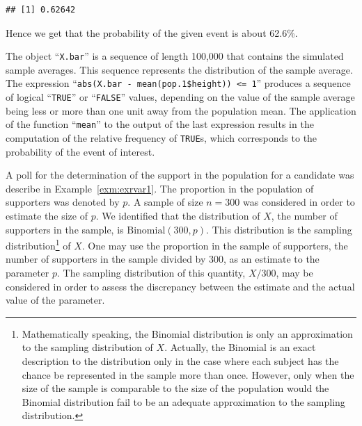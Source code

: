 \documentclass[]{krantz}
\makeatletter
\newenvironment{Shaded}{\begin{snugshade}}{\end{snugshade}}
\newcommand{\KeywordTok}[1]{\textcolor[rgb]{0.13,0.29,0.53}{\textbf{#1}}}
\newcommand{\DecValTok}[1]{\textcolor[rgb]{0.00,0.00,0.81}{#1}}
\newcommand{\StringTok}[1]{\textcolor[rgb]{0.31,0.60,0.02}{#1}}
\newcommand{\OperatorTok}[1]{\textcolor[rgb]{0.81,0.36,0.00}{\textbf{#1}}}
\newcommand{\NormalTok}[1]{#1}
\newenvironment{kframe}{%
\medskip{}
\setlength{\fboxsep}{.8em}
 \def\at@end@of@kframe{}%
 \ifinner\ifhmode%
  \def\at@end@of@kframe{\end{minipage}}%
  \begin{minipage}{\columnwidth}%
 \fi\fi%
 \def\FrameCommand##1{\hskip\@totalleftmargin \hskip-\fboxsep
 \colorbox{shadecolor}{##1}\hskip-\fboxsep
     \hskip-\linewidth \hskip-\@totalleftmargin \hskip\columnwidth}%
 \MakeFramed {\advance\hsize-\width
   \@totalleftmargin\z@ \linewidth\hsize
   \@setminipage}}%
 {\par\unskip\endMakeFramed%
 \at@end@of@kframe}
\renewenvironment{Shaded}{\begin{kframe}}{\end{kframe}}
\theoremstyle{definition}
\theoremstyle{definition}
\theoremstyle{definition}
\theoremstyle{remark}
\let\BeginKnitrBlock\begin \let\EndKnitrBlock\end
\makeatother
\begin{document}
\begin{Shaded}
\end{Shaded}

\begin{verbatim}
## [1] 0.62642
\end{verbatim}

Hence we get that the probability of the given event is about 62.6\%.

The object ``\texttt{X.bar}'' is a sequence of length 100,000 that
contains the simulated sample averages. This sequence represents the
distribution of the sample average. The expression
``\texttt{abs(X.bar\ -\ mean(pop.1\$height))\ \textless{}=\ 1}''
produces a sequence of logical ``\texttt{TRUE}'' or ``\texttt{FALSE}''
values, depending on the value of the sample average being less or more
than one unit away from the population mean. The application of the
function ``\texttt{mean}'' to the output of the last expression results
in the computation of the relative frequency of \texttt{TRUE}s, which
corresponds to the probability of the event of interest.

\BeginKnitrBlock{example}
\protect\hypertarget{exm:exsampdist1}{}{\label{exm:exsampdist1} }A poll for
the determination of the support in the population for a candidate was
describe in Example~\ref{exm:exrvar1}. The proportion in the population
of supporters was denoted by \(p\). A sample of size \(n=300\) was
considered in order to estimate the size of \(p\). We identified that
the distribution of \(X\), the number of supporters in the sample, is
\(\mathrm{Binomial}(300,p)\). This distribution is the sampling
distribution\footnote{Mathematically speaking, the Binomial distribution
  is only an approximation to the sampling distribution of \(X\).
  Actually, the Binomial is an exact description to the distribution
  only in the case where each subject has the chance be represented in
  the sample more than once. However, only when the size of the sample
  is comparable to the size of the population would the Binomial
  distribution fail to be an adequate approximation to the sampling
  distribution.} of \(X\). One may use the proportion in the sample of
supporters, the number of supporters in the sample divided by 300, as an
estimate to the parameter \(p\). The sampling distribution of this
quantity, \(X/300\), may be considered in order to assess the
discrepancy between the estimate and the actual value of the parameter.
\EndKnitrBlock{example}
\end{document}
